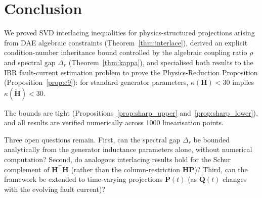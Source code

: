 \documentclass[11pt,a4paper]{article}
\theoremstyle{plain}
\theoremstyle{definition}
\theoremstyle{remark}
\newcommand{\bfH}{\mathbf{H}}
\newcommand{\bfHt}{\tilde{\mathbf{H}}}
\newcommand{\bfP}{\mathbf{P}}
\newcommand{\bfQ}{\mathbf{Q}}
\begin{document}
\section{Conclusion}
\label{sec:conclusion}

We proved SVD interlacing inequalities for physics-structured projections
arising from DAE algebraic constraints (Theorem~\ref{thm:interlace}),
derived an explicit condition-number inheritance bound controlled by the
algebraic coupling ratio $\rho$ and spectral gap $\Delta_r$
(Theorem~\ref{thm:kappa}), and specialised both results to the IBR
fault-current estimation problem to prove the Physics-Reduction
Proposition (Proposition~\ref{prop:c9}): for standard generator
parameters, $\kappa(\bfH) < 30$ implies $\kappa(\bfHt) < 30$.

The bounds are tight (Propositions~\ref{prop:sharp_upper}
and~\ref{prop:sharp_lower}), and all results are verified numerically
across 1000 linearisation points.

Three open questions remain.
First, can the spectral gap $\Delta_r$ be bounded analytically from
the generator inductance parameters alone, without numerical computation?
Second, do analogous interlacing results hold for the Schur complement
of $\bfH^\top\bfH$ (rather than the column-restriction $\bfH\bfP$)?
Third, can the framework be extended to time-varying projections
$\bfP(t)$ (as $\bfQ(t)$ changes with the evolving fault current)?



\end{document}
